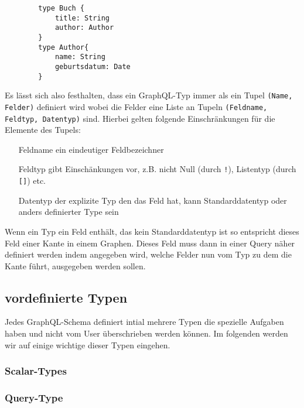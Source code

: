 \begin{center}
    \begin{verbatim}
        type Buch {
            title: String
            author: Author
        }
        type Author{
            name: String
            geburtsdatum: Date
        }
    \end{verbatim}
\end{center}

Es lässt sich also festhalten, dass ein GraphQL-Typ immer als ein Tupel \verb+(Name, Felder)+ definiert wird wobei
die Felder eine Liste an Tupeln \verb+(Feldname, Feldtyp, Datentyp)+ sind.
Hierbei gelten folgende Einschränkungen für die Elemente des Tupels:

\begin{center}
    \begin{itemize}
        \item[Feldname] ein eindeutiger Feldbezeichner
        \item[Feldtyp] gibt Einschänkungen vor, z.B. nicht Null (durch \verb+!+), Listentyp (durch \verb+[]+) etc.
        \item[Datentyp] der explizite Typ den das Feld hat, kann Standarddatentyp oder anders definierter Type sein
    \end{itemize}
\end{center}

Wenn ein Typ ein Feld enthält, das kein Standarddatentyp ist so entspricht dieses Feld einer Kante in einem Graphen.
Dieses Feld muss dann in einer Query näher definiert werden indem angegeben wird, welche Felder nun vom Typ zu dem die
Kante führt, ausgegeben werden sollen.

\subsection{vordefinierte Typen}

Jedes GraphQL-Schema definiert intial mehrere Typen die spezielle Aufgaben haben und nicht vom User überschrieben werden können.
Im folgenden werden wir auf einige wichtige dieser Typen eingehen.

\subsubsection{Scalar-Types}




\subsubsection{Query-Type}

